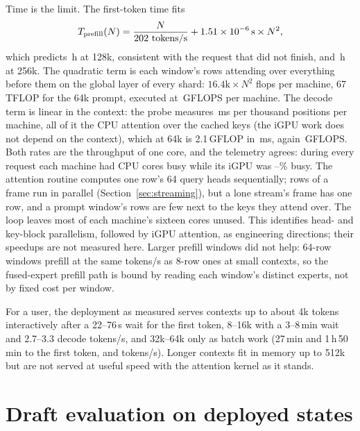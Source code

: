 \documentclass[11pt]{article}
\begin{document}
Time is the limit. The first-token time fits
\begin{equation}
 T_{\rm prefill}(N)=\frac{N}{\CtxLinearRate{}\ \text{tokens/s}}+\CtxQuadraticCoeff{}\times10^{-6}\,\text{s}\times N^{2},
 \label{eq:prefill}
\end{equation}
which predicts \CtxPredictHoursOneTwoEightK{}\,h at 128k, consistent with the request that did not finish, and \CtxPredictHoursTwoFiveSixK{}\,h at 256k. The quadratic term is each window's rows attending over everything before them on the global layer of every shard: $16.4\text{k}\times N^{2}$ flops per machine, 67\,TFLOP for the 64k prompt, executed at \CtxQuadraticGflops{}\,GFLOPS per machine. The decode term is linear in the context: the probe measures \ProbeAttnSlope{}\,ms per thousand positions per machine, all of it the CPU attention over the cached keys (the iGPU work does not depend on the context), which at 64k is 2.1\,GFLOP in \ProbeAttnSixtyFourK{}\,ms, again \ProbeAttnGflopsSixtyFourK{}\,GFLOPS. Both rates are the throughput of one core, and the telemetry agrees: during every request each machine had \CtxCoresBusy{} CPU cores busy while its iGPU was \CtxGpuBusySixtyFourK{}--\CtxGpuBusyOneK{}\% busy. The attention routine computes one row's 64 query heads sequentially; rows of a frame run in parallel (Section~\ref{sec:streaming}), but a lone stream's frame has one row, and a prompt window's rows are few next to the keys they attend over. The loop leaves most of each machine's sixteen cores unused. This identifies head- and key-block parallelism, followed by iGPU attention, as engineering directions; their speedups are not measured here. Larger prefill windows did not help: 64-row windows prefill at the same \CtxPrefillRateSmall{} tokens/s as 8-row ones at small contexts, so the fused-expert prefill path is bound by reading each window's distinct experts, not by fixed cost per window.

For a user, the deployment as measured serves contexts up to about 4k tokens interactively after a 22--76\,s wait for the first token, 8--16k with a 3--8\,min wait and 2.7--3.3 decode tokens/s, and 32k--64k only as batch work (27\,min and 1\,h\,50\,min to the first token, \CtxDecodeThirtyTwoK{} and \CtxDecodeSixtyFourK{} tokens/s). Longer contexts fit in memory up to 512k but are not served at useful speed with the attention kernel as it stands.

\section{Draft evaluation on deployed states}
\label{sec:drafts}
\end{document}
